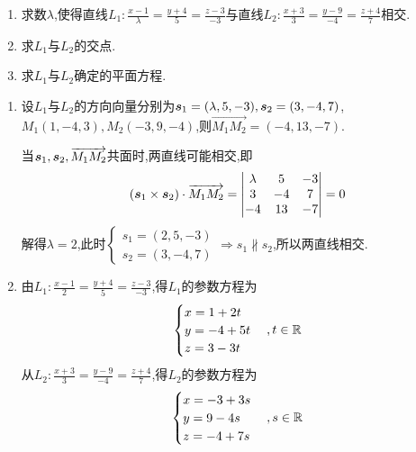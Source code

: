 \begin{example}
    \begin{enumerate}
        \item 求数$\lambda$,使得直线$L_1:\frac{x-1}{\lambda} = \frac{y+4}{5} = \frac{z-3}{-3}$与直线$L_2:\frac{x+3}{3} = \frac{y-9}{-4} = \frac{z+4}{7}$相交.
        \item 求$L_1$与$L_2$的交点.
        \item 求$L_1$与$L_2$确定的平面方程.
    \end{enumerate}

\end{example}

\begin{solution}
    \begin{enumerate}
        \item 设$L_1$与$L_2$的方向向量分别为$\bm{s}_1 = (\lambda,5,-3),\bm{s}_2 = (3,-4,7)$,$M_1(1,-4,3),M_2(-3,9,-4)$,则$\overrightarrow{M_1 M_2} = (-4,13,-7)$.
        
        当$\bm{s}_1,\bm{s}_2,\overrightarrow{M_1 M_2}$共面时,两直线可能相交,即
        $$
        (\bm{s}_1 \times \bm{s}_2) \cdot \overrightarrow{M_1 M_2} = \begin{vmatrix}
            \lambda & 5 & -3 \\
            3 & -4 & 7 \\
            -4 & 13 & -7
        \end{vmatrix} = 0
        $$ 
        解得$\lambda = 2$,此时$\begin{cases}
            s_1 = (2,5,-3) \\
            s_2 = (3,-4,7)
        \end{cases} \Rightarrow %
        s_1 \nparallel s_2$,所以两直线相交.

        \item 由$L_1:\frac{x-1}{2} = \frac{y+4}{5} = \frac{z-3}{-3}$,得$L_1$的参数方程为
        $$
        \begin{cases}
            x = 1+2t \\
            y = -4+5t \\
            z = 3-3t
        \end{cases},t \in \mathbb{R}
        $$
        从$L_2:\frac{x+3}{3} = \frac{y-9}{-4} = \frac{z+4}{7}$,得$L_2$的参数方程为
        $$
        \begin{cases}
            x = -3+3s \\
            y = 9-4s \\
            z = -4+7s
        \end{cases},s \in \mathbb{R}
        $$


\end{enumerate}
\end{solution}
